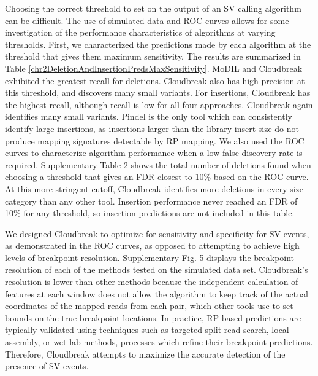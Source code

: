 \documentclass{bioinfo}
\newcommand{\todo}[1]{}
\begin{document}
Choosing the correct threshold to set on the output of an SV calling algorithm can be difficult. The use of simulated data and ROC curves allows for some investigation of the performance characteristics of algorithms at varying thresholds. First, we characterized the predictions made by each algorithm at the threshold that gives them maximum sensitivity. \todo{For Cloudbreak we chose an operating point at which marginal improvements in sensitivity became very low.} The results are summarized in Table \ref{chr2DeletionAndInsertionPredsMaxSensitivity}. MoDIL and Cloudbreak exhibited the greatest recall for deletions. Cloudbreak also has high precision at this threshold, and discovers many small variants. For insertions, Cloudbreak has the highest recall, although recall is low for all four approaches. Cloudbreak again identifies many small variants. Pindel is the only tool which can consistently identify large insertions, as insertions larger than the library insert size do not produce mapping signatures detectable by RP mapping. We also used the ROC curves to characterize algorithm performance when a low false discovery rate is required. Supplementary Table 2\todo{\ref{Schr2DeletionPredsFDR10}} shows the total number of deletions found when choosing a threshold that gives an FDR closest to 10\% based on the ROC curve. At this more stringent cutoff, Cloudbreak identifies more deletions in every size category than any other tool. Insertion performance never reached an FDR of 10\% for any threshold, so insertion predictions are not included in this table.\todo{ We also examined Cloudbreak's ability to detect events in repetitive regions of the genome, and found that it was similar to the other methods tested (Supplementary Tables \ref{SdeletionRepmaskpreds} and \ref{SinsertionRepmaskpreds}).}

We designed Cloudbreak to optimize for sensitivity and specificity for SV events, as demonstrated in the ROC curves, as opposed to attempting to achieve high levels of breakpoint resolution. Supplementary Fig. 5\todo{\ref{Sbreakpoint_resolution}} displays the breakpoint resolution of each of the methods tested on the simulated data set. Cloudbreak's resolution is lower than other methods because the independent calculation of features at each window does not allow the algorithm to keep track of the actual coordinates of the mapped reads from each pair, which other tools use to set bounds on the true breakpoint locations. In practice, RP-based predictions are typically validated using techniques such as targeted split read search, local assembly, or wet-lab methods, processes which refine their breakpoint predictions. Therefore, Cloudbreak attempts to maximize the accurate detection of the presence of SV events.
\end{document}
